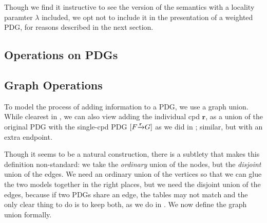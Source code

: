\documentclass{article}
\theoremstyle{plain}
\theoremstyle{definition}
\theoremstyle{remark}
\newcommand\mat[1]{\mathbf{#1}}
\newcommand{\MN}{PDG}
\numberwithin{equation}{section}
\begin{document}
	Though we find it instructive to see the version of the semantics with a locality paramter $\lambda$ included, we opt not to include it in the presentation of a weighted PDG, for reasons described in the next section.
	
	\begin{vfull}
	\section{Operations on PDGs}\label{sec:pdg-operations}
	\subsection{Graph Operations}
	To model the process of adding information to a \MN, we use a graph union. While clearest in , we can also view adding the individual cpd $\mat r$, as a union of the original PDG with the single-cpd PDG $[F \smash{\xrightarrow{\mat r}} G]$ as we did in ;  similar, but with an extra endpoint.
	
	Though it seems to be a natural construction, there is a subtlety that makes this definition non-standard: we take the \emph{ordinary} union of the nodes, but the \emph{disjoint} union of the edges. We need an ordinary union of the vertices so that we can glue the two models together in the right places, but we need the disjoint union of the edges, because if two PDGs share an edge, the tables may not match and the only clear thing to do is to keep both, as we do in . 
	We now define the graph union formally. 


\end{vfull}
\end{document}

